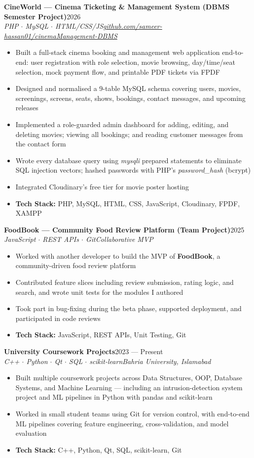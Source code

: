 \documentclass[10pt,a4paper]{article}
\newcommand{\entry}[4]{%
  \vspace{4pt}
  \noindent\textbf{#1}\hfill #2\\
  \noindent\textit{#3}\hfill \textit{#4}\\
  \vspace{-6pt}
}
\begin{document}
\entry{CineWorld --- Cinema Ticketing \& Management System (DBMS Semester Project)}{2026}
      {PHP $\cdot$ MySQL $\cdot$ HTML/CSS/JS}
      {\href{https://github.com/sameer-hassan01/cinemaManagement-DBMS}{github.com/sameer-hassan01/cinemaManagement-DBMS}}
\begin{itemize}
  \item Built a full-stack cinema booking and management web application end-to-end: user registration with role selection, movie browsing, day/time/seat selection, mock payment flow, and printable PDF tickets via FPDF
  \item Designed and normalised a 9-table MySQL schema covering users, movies, screenings, screens, seats, shows, bookings, contact messages, and upcoming releases
  \item Implemented a role-guarded admin dashboard for adding, editing, and deleting movies; viewing all bookings; and reading customer messages from the contact form
  \item Wrote every database query using \textit{mysqli} prepared statements to eliminate SQL injection vectors; hashed passwords with PHP's \textit{password\_hash} (bcrypt)
  \item Integrated Cloudinary's free tier for movie poster hosting
  \item \textbf{Tech Stack:} PHP, MySQL, HTML, CSS, JavaScript, Cloudinary, FPDF, XAMPP
\end{itemize}

\entry{FoodBook --- Community Food Review Platform (Team Project)}{2025}
      {JavaScript $\cdot$ REST APIs $\cdot$ Git}
      {Collaborative MVP}
\begin{itemize}
  \item Worked with another developer to build the MVP of \textbf{FoodBook}, a community-driven food review platform
  \item Contributed feature slices including review submission, rating logic, and search, and wrote unit tests for the modules I authored
  \item Took part in bug-fixing during the beta phase, supported deployment, and participated in code reviews
  \item \textbf{Tech Stack:} JavaScript, REST APIs, Unit Testing, Git
\end{itemize}

\entry{University Coursework Projects}{2023 --- Present}
      {C++ $\cdot$ Python $\cdot$ Qt $\cdot$ SQL $\cdot$ scikit-learn}
      {Bahria University, Islamabad}
\begin{itemize}
  \item Built multiple coursework projects across Data Structures, OOP, Database Systems, and Machine Learning --- including an intrusion-detection system project and ML pipelines in Python with pandas and scikit-learn
  \item Worked in small student teams using Git for version control, with end-to-end ML pipelines covering feature engineering, cross-validation, and model evaluation
  \item \textbf{Tech Stack:} C++, Python, Qt, SQL, scikit-learn, Git
\end{itemize}
\end{document}
